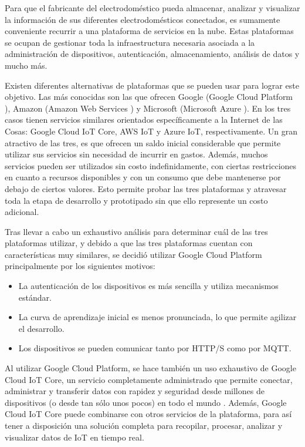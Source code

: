 Para que el fabricante del electrodoméstico pueda almacenar, analizar y visualizar la información de sus diferentes electrodomésticos conectados, es sumamente conveniente recurrir a una plataforma de servicios en la nube. Estas plataformas se ocupan de gestionar toda la infraestructura necesaria asociada a la administración de dispositivos, autenticación, almacenamiento, análisis de datos y mucho más.

Existen diferentes alternativas de plataformas que se pueden usar para lograr este objetivo. Las más conocidas son las que ofrecen Google (Google Cloud Platform \citep{google_cloud_platform}), Amazon (Amazon Web Services \citep{aws}) y Microsoft (Microsoft Azure \citep{microsoft_azure}). En los tres casos tienen servicios similares orientados específicamente a la Internet de las Cosas: Google Cloud IoT Core, AWS IoT y Azure IoT, respectivamente. Un gran atractivo de las tres, es que ofrecen un saldo inicial considerable que permite utilizar sus servicios sin necesidad de incurrir en gastos. Además, muchos servicios pueden ser utilizados sin costo indefinidamente, con ciertas restricciones en cuanto a recursos disponibles y con un consumo que debe mantenerse por debajo de ciertos valores. Esto permite probar las tres plataformas y atravesar toda la etapa de desarrollo y prototipado sin que ello represente un costo adicional. 

Tras llevar a cabo un exhaustivo análisis para determinar cuál de las tres plataformas utilizar, y debido a que las tres plataformas cuentan con características muy similares, se decidió utilizar Google Cloud Platform principalmente por los siguientes motivos:

\begin{itemize}
	\item La autenticación de los dispositivos es más sencilla y utiliza mecanismos estándar. 
	\item La curva de aprendizaje inicial es menos pronunciada, lo que permite agilizar el desarrollo.
	\item Los dispositivos se pueden comunicar tanto por HTTP/S como por MQTT.
\end{itemize}

Al utilizar Google Cloud Platform, se hace también un uso exhaustivo de Google Cloud IoT Core, un servicio completamente administrado que permite conectar, administrar y transferir datos con rapidez y seguridad desde millones de dispositivos (o desde tan sólo unos pocos) en todo el mundo \citep{iot_core}. Además, Google Cloud IoT Core puede combinarse con otros servicios de la plataforma, para así tener a disposición una solución completa para recopilar, procesar, analizar y visualizar datos de IoT en tiempo real.

